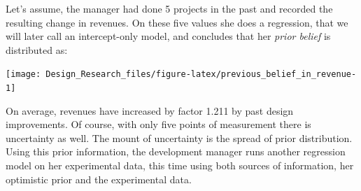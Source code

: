 \documentclass[]{svmono}
\newenvironment{Shaded}{\begin{snugshade}}{\end{snugshade}}
\newcommand{\KeywordTok}[1]{\textcolor[rgb]{0.13,0.29,0.53}{\textbf{#1}}}
\newcommand{\DataTypeTok}[1]{\textcolor[rgb]{0.13,0.29,0.53}{#1}}
\newcommand{\DecValTok}[1]{\textcolor[rgb]{0.00,0.00,0.81}{#1}}
\newcommand{\StringTok}[1]{\textcolor[rgb]{0.31,0.60,0.02}{#1}}
\newcommand{\OperatorTok}[1]{\textcolor[rgb]{0.81,0.36,0.00}{\textbf{#1}}}
\newcommand{\NormalTok}[1]{#1}
\begin{document}
\begin{Shaded}
\end{Shaded}

Let's assume, the manager had done 5 projects in the past and recorded
the resulting change in revenues. On these five values she does a
regression, that we will later call an intercept-only model, and
concludes that her \emph{prior belief} is distributed as:

\begin{Shaded}
\end{Shaded}

\texttt{[image: Design\_Research\_files/figure-latex/previous\_belief\_in\_revenue-1]}

On average, revenues have increased by factor 1.211 by past design
improvements. Of course, with only five points of measurement there is
uncertainty as well. The mount of uncertainty is the spread of prior
distribution. Using this prior information, the development manager runs
another regression model on her experimental data, this time using both
sources of information, her optimistic prior and the experimental data.
\end{document}
